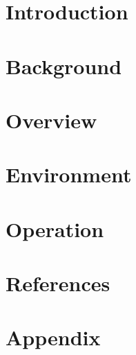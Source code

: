 \documentclass{article}
\title{}
\author{}
\date{}
\begin{document}
    

    \tableofcontents
    \listoffigures

    \newpage
    \begin{versionhistory}
    \end{versionhistory}
    \newpage

    \section{Introduction}

    \section{Background}

    \section{Overview}

    \section{Environment}

    \section{Operation}

    \section*{References}

    \appendix
    \section{Appendix}
\end{document}
